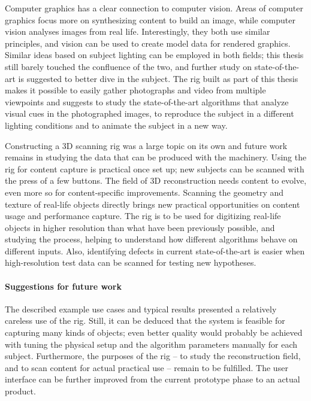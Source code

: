 Computer graphics has a clear connection to computer vision.
Areas of computer graphics focus more on synthesizing content to build an image, while computer vision analyses images from real life.
Interestingly, they both use similar principles, and vision can be used to create model data for rendered graphics.
Similar ideas based on subject lighting can be employed in both fields; this thesis still barely touched the confluence of the two, and further study on state-of-the-art is suggested to better dive in the subject.
The rig built as part of this thesis makes it possible to easily gather photographs and video from multiple viewpoints and suggests to study the state-of-the-art algorithms that analyze visual cues in the photographed images, to reproduce the subject in a different lighting conditions and to animate the subject in a new way.

Constructing a 3D scanning rig was a large topic on its own and future work remains in studying the data that can be produced with the machinery.
Using the rig for content capture is practical once set up; new subjects can be scanned with the press of a few buttons.
The field of 3D reconstruction needs content to evolve, even more so for content-specific improvements.
Scanning the geometry and texture of real-life objects directly brings new practical opportunities on content usage and performance capture.
The rig is to be used for digitizing real-life objects in higher resolution than what have been previously possible, and studying the process, helping to understand how different algorithms behave on different inputs.
Also, identifying defects in current state-of-the-art is easier when high-resolution test data can be scanned for testing new hypotheses.


\paragraph{Suggestions for future work}
The described example use cases and typical results presented a relatively careless use of the rig.
Still, it can be deduced that the system is feasible for capturing many kinds of objects; even better quality would probably be achieved with tuning the physical setup and the algorithm parameters manually for each subject.
Furthermore, the purposes of the rig -- to study the reconstruction field, and to scan content for actual practical use -- remain to be fulfilled.
The user interface can be further improved from the current prototype phase to an actual product.


